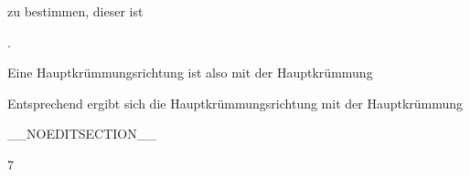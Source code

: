 {zu bestimmen, dieser ist

 { . }

Eine Hauptkrümmungsrichtung ist also
 mit der Hauptkrümmung

Entsprechend ergibt sich die Hauptkrümmungsrichtung
 mit der Hauptkrümmung

 }

__NOEDITSECTION__

{7}

